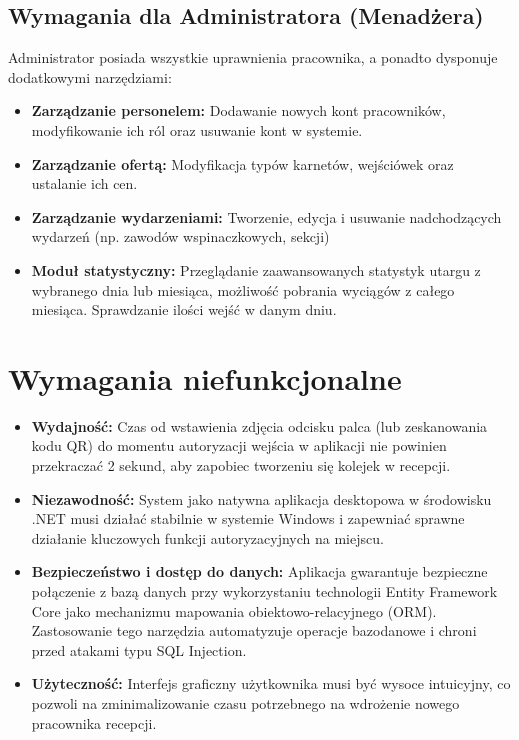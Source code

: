 \subsection{Wymagania dla Administratora (Menadżera)}
Administrator posiada wszystkie uprawnienia pracownika, a ponadto dysponuje dodatkowymi narzędziami:
\begin{itemize}
    \item \textbf{Zarządzanie personelem:} Dodawanie nowych kont pracowników, modyfikowanie ich ról oraz usuwanie kont w systemie.
    \item \textbf{Zarządzanie ofertą:} Modyfikacja typów karnetów, wejściówek oraz ustalanie ich cen.
    \item \textbf{Zarządzanie wydarzeniami:} Tworzenie, edycja i usuwanie nadchodzących wydarzeń (np. zawodów wspinaczkowych, sekcji)
    \item \textbf{Moduł statystyczny:} Przeglądanie zaawansowanych statystyk utargu z wybranego dnia lub miesiąca, możliwość pobrania wyciągów z całego miesiąca. Sprawdzanie ilości wejść w danym dniu.
\end{itemize}

\section{Wymagania niefunkcjonalne}
\label{sec:wymaganiaNiefunkcjonalne}

\begin{itemize}
    \item \textbf{Wydajność:} Czas od wstawienia zdjęcia odcisku palca (lub zeskanowania kodu QR) do momentu autoryzacji wejścia w aplikacji nie powinien przekraczać 2 sekund, aby zapobiec tworzeniu się kolejek w recepcji.
    \item \textbf{Niezawodność:} System jako natywna aplikacja desktopowa w środowisku .NET musi działać stabilnie w systemie Windows i zapewniać sprawne działanie kluczowych funkcji autoryzacyjnych na miejscu.
    \item \textbf{Bezpieczeństwo i dostęp do danych:} Aplikacja gwarantuje bezpieczne połączenie z bazą danych przy wykorzystaniu technologii Entity Framework Core jako mechanizmu mapowania obiektowo-relacyjnego (ORM). Zastosowanie tego narzędzia automatyzuje operacje bazodanowe i chroni przed atakami typu SQL Injection.
    \item \textbf{Użyteczność:} Interfejs graficzny użytkownika musi być wysoce intuicyjny, co pozwoli na zminimalizowanie czasu potrzebnego na wdrożenie nowego pracownika recepcji.
\end{itemize}

